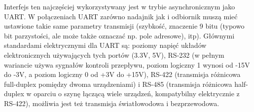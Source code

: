     Interfejs ten najczęściej wykorzystywany jest w trybie asynchronicznym jako UART. W połączeniach UART zarówno nadajnik jak i odbiornik muszą mieć ustawione takie same parametry transmisji (szybkość, znaczenie 9 bitu (typowo bit parzystości, ale może także oznaczać np. pole adresowe), itp).
    Głównymi standardami elektrycznymi dla UART są: poziomy napięć układów elektronicznych używających tych portów (3.3V, 5V), RS-232 (w pełnym wariancie używa sygnałów kontroli przepływu, poziom logiczny 1 wynosi od -15V do -3V, a poziom logiczny 0 od +3V do +15V), RS-422 (transmisja różnicowa full-duplex pomiędzy dwoma urządzeniami) i RS-485 (transmisja różnicowa half-duplex w oparciu o szynę łączącą wiele urządzeń, kompatybilny elektrycznie z RS-422), możliwia jest też transmisja światłowodowa i bezprzewodowa.

